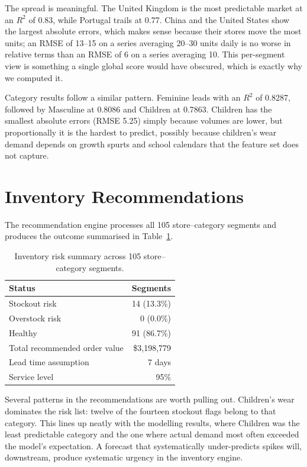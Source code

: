 \documentclass[11pt,a4paper]{article}
\begin{document}
The spread is meaningful. The United Kingdom is the most predictable market at an $R^2$ of 0.83, while Portugal trails at 0.77. China and the United States show the largest absolute errors, which makes sense because their stores move the most units; an RMSE of 13--15 on a series averaging 20--30 units daily is no worse in relative terms than an RMSE of 6 on a series averaging 10. This per-segment view is something a single global score would have obscured, which is exactly why we computed it.

Category results follow a similar pattern. Feminine leads with an $R^2$ of 0.8287, followed by Masculine at 0.8086 and Children at 0.7863. Children has the smallest absolute errors (RMSE 5.25) simply because volumes are lower, but proportionally it is the hardest to predict, possibly because children's wear demand depends on growth spurts and school calendars that the feature set does not capture.

\section{Inventory Recommendations}\label{sec:inventory}

The recommendation engine processes all 105 store--category segments and produces the outcome summarised in Table~\ref{tab:invsum}.

\begin{table}[h]
\centering
\caption{Inventory risk summary across 105 store--category segments.}
\label{tab:invsum}
\begin{tabular}{lr}
\toprule
Status & Segments \\
\midrule
Stockout risk & 14 (13.3\%) \\
Overstock risk & 0 (0.0\%) \\
Healthy & 91 (86.7\%) \\
\midrule
Total recommended order value & \$3,198,779 \\
Lead time assumption & 7 days \\
Service level & 95\% \\
\bottomrule
\end{tabular}
\end{table}

Several patterns in the recommendations are worth pulling out. Children's wear dominates the risk list: twelve of the fourteen stockout flags belong to that category. This lines up neatly with the modelling results, where Children was the least predictable category and the one where actual demand most often exceeded the model's expectation. A forecast that systematically under-predicts spikes will, downstream, produce systematic urgency in the inventory engine.
\end{document}
